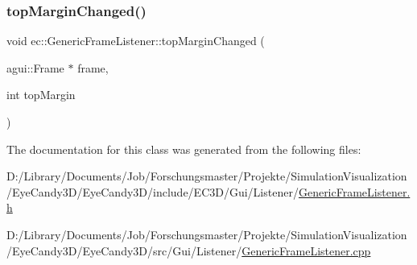 \subsubsection{\texorpdfstring{top\+Margin\+Changed()}{topMarginChanged()}}
{\footnotesize\ttfamily void ec\+::\+Generic\+Frame\+Listener\+::top\+Margin\+Changed (\begin{DoxyParamCaption}\item[{agui\+::\+Frame $\ast$}]{frame,  }\item[{int}]{top\+Margin }\end{DoxyParamCaption})\hspace{0.3cm}{\ttfamily [override]}}



The documentation for this class was generated from the following files\+:\begin{DoxyCompactItemize}
\item 
D\+:/\+Library/\+Documents/\+Job/\+Forschungsmaster/\+Projekte/\+Simulation\+Visualization/\+Eye\+Candy3\+D/\+Eye\+Candy3\+D/include/\+E\+C3\+D/\+Gui/\+Listener/\mbox{\hyperlink{_generic_frame_listener_8h}{Generic\+Frame\+Listener.\+h}}\item 
D\+:/\+Library/\+Documents/\+Job/\+Forschungsmaster/\+Projekte/\+Simulation\+Visualization/\+Eye\+Candy3\+D/\+Eye\+Candy3\+D/src/\+Gui/\+Listener/\mbox{\hyperlink{_generic_frame_listener_8cpp}{Generic\+Frame\+Listener.\+cpp}}\end{DoxyCompactItemize}
